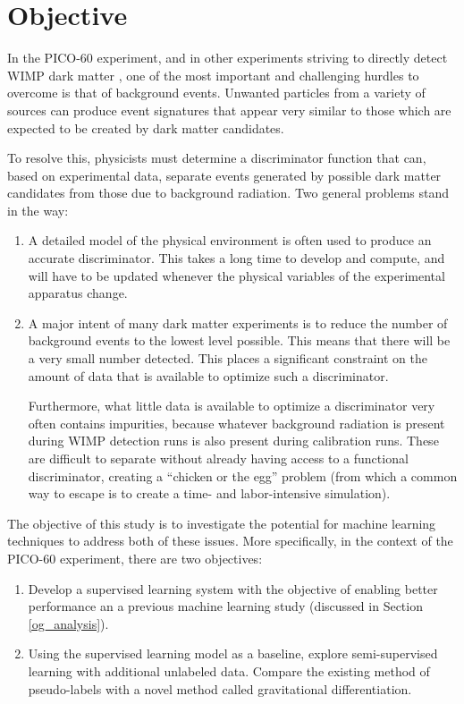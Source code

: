 \documentclass[10pt]{article}
\begin{document}
\section{Objective} \label{objective}

In the PICO-60 \cite{pico} experiment, and in other experiments striving to directly detect WIMP dark matter \cite{wimp}, one of the most important and challenging hurdles to overcome is that of background events. Unwanted particles from a variety of sources can produce event signatures that appear very similar to those which are expected to be created by dark matter candidates.

To resolve this, physicists must determine a discriminator function that can, based on experimental data, separate events generated by possible dark matter candidates from those due to background radiation. Two general problems stand in the way:

\begin{enumerate}
    \item A detailed model of the physical environment is often used to produce an accurate discriminator. This takes a long time to develop and compute, and will have to be updated whenever the physical variables of the experimental apparatus change.

    \item A major intent of many dark matter experiments is to reduce the number of background events to the lowest level possible. This means that there will be a very small number detected. This places a significant constraint on the amount of data that is available to optimize such a discriminator.

    Furthermore, what little data is available to optimize a discriminator very often contains impurities, because whatever background radiation is present during WIMP detection runs is also present during calibration runs. These are difficult to separate without already having access to a functional discriminator, creating a ``chicken or the egg'' problem (from which a common way to escape is to create a time- and labor-intensive simulation).
\end{enumerate}

The objective of this study is to investigate the potential for machine learning techniques to address both of these issues. More specifically, in the context of the PICO-60 experiment, there are two objectives:

\begin{enumerate}
    \item Develop a supervised learning system with the objective of enabling better performance an a previous machine learning study (discussed in Section \ref{og_analysis}).
    \item Using the supervised learning model as a baseline, explore semi-supervised learning with additional unlabeled data. Compare the existing method of pseudo-labels with a novel method called gravitational differentiation.
\end{enumerate}
\end{document}
